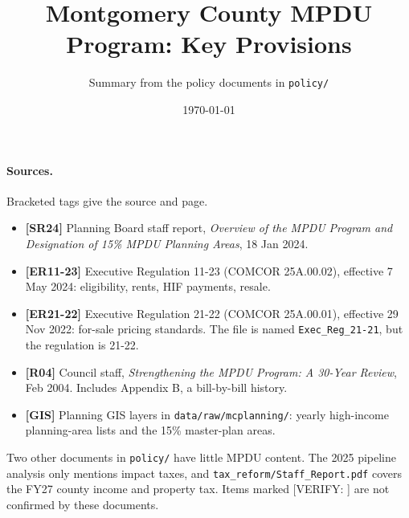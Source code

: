 \documentclass[11pt]{article}
\title{Montgomery County MPDU Program: Key Provisions}
\author{Summary from the policy documents in \texttt{policy/}}
\date{\today}
\newcommand{\verify}[1]{\textcolor{red!70!black}{[VERIFY: #1]}}
\begin{document}
\maketitle

\paragraph{Sources.} Bracketed tags give the source and page.
\begin{itemize}
  \item \textbf{[SR24]} Planning Board staff report, \emph{Overview of the MPDU Program and Designation of 15\% MPDU Planning Areas}, 18 Jan 2024.
  \item \textbf{[ER11-23]} Executive Regulation 11-23 (COMCOR 25A.00.02), effective 7 May 2024: eligibility, rents, HIF payments, resale.
  \item \textbf{[ER21-22]} Executive Regulation 21-22 (COMCOR 25A.00.01), effective 29 Nov 2022: for-sale pricing standards. The file is named \texttt{Exec\_Reg\_21-21}, but the regulation is 21-22.
  \item \textbf{[R04]} Council staff, \emph{Strengthening the MPDU Program: A 30-Year Review}, Feb 2004. Includes Appendix B, a bill-by-bill history.
  \item \textbf{[GIS]} Planning GIS layers in \texttt{data/raw/mcplanning/}: yearly high-income planning-area lists and the 15\% master-plan areas.
\end{itemize}
Two other documents in \texttt{policy/} have little MPDU content. The 2025 pipeline analysis only mentions impact taxes, and \texttt{tax\_reform/Staff\_Report.pdf} covers the FY27 county income and property tax. Items marked \verify{} are not confirmed by these documents.

\end{document}
